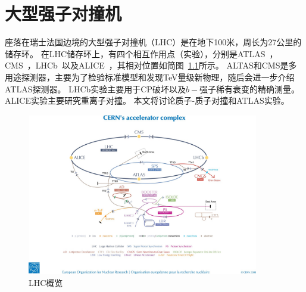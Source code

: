 \chapter{大型强子对撞机} \label{chap:LHC}
座落在瑞士法国边境的大型强子对撞机（LHC）是在地下100米，周长为27公里的储存环。
在LHC储存环上，有四个相互作用点（实验），分别是ATLAS~\cite{ATLAS_Collaboration_2008}，CMS~\cite{CMS_Collaboration_2008}，LHCb~\cite{LHCb_Collaboration_2008}以及ALICE~\cite{ALICE_Collaboration_2008}，其相对位置如简图~\ref{fig:LHC_schematic}所示。
ALTAS和CMS是多用途探测器，主要为了检验标准模型和发现TeV量级新物理，随后会进一步介绍ATLAS探测器。
LHCb实验主要用于CP破坏以及$b-$强子稀有衰变的精确测量。ALICE实验主要研究重离子对撞。
本文将讨论质子-质子对撞和ATLAS实验。
\begin{figure}[h]
\begin{center}
\includegraphics[width = 0.9\textwidth,angle=-90]{fig/LHC-shematic.jpg}
\caption{LHC概览} \label{fig:LHC_schematic}
\end{center}
\end{figure}

